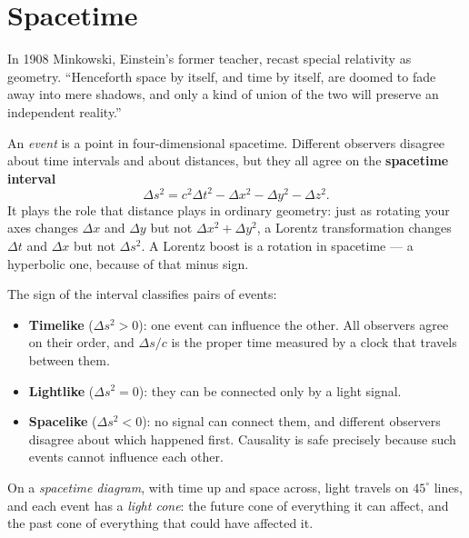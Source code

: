 \section{Spacetime}

In 1908 Minkowski, Einstein's former teacher, recast special relativity as geometry. ``Henceforth space by itself, and time by itself, are doomed to fade away into mere shadows, and only a kind of union of the two will preserve an independent reality.''

An \emph{event} is a point in four-dimensional spacetime. Different observers disagree about time intervals and about distances, but they all agree on the \textbf{spacetime interval}
\[
  \Delta s^2 = c^2\Delta t^2 - \Delta x^2 - \Delta y^2 - \Delta z^2 .
\]
It plays the role that distance plays in ordinary geometry: just as rotating your axes changes $\Delta x$ and $\Delta y$ but not $\Delta x^2+\Delta y^2$, a Lorentz transformation changes $\Delta t$ and $\Delta x$ but not $\Delta s^2$. A Lorentz boost is a rotation in spacetime --- a hyperbolic one, because of that minus sign.

The sign of the interval classifies pairs of events:
\begin{itemize}[itemsep=3pt]
  \item \textbf{Timelike} ($\Delta s^2>0$): one event can influence the other. All observers agree on their order, and $\Delta s/c$ is the proper time measured by a clock that travels between them.
  \item \textbf{Lightlike} ($\Delta s^2 = 0$): they can be connected only by a light signal.
  \item \textbf{Spacelike} ($\Delta s^2<0$): no signal can connect them, and different observers disagree about which happened first. Causality is safe precisely because such events cannot influence each other.
\end{itemize}
On a \emph{spacetime diagram}, with time up and space across, light travels on $45^\circ$ lines, and each event has a \emph{light cone}: the future cone of everything it can affect, and the past cone of everything that could have affected it.

